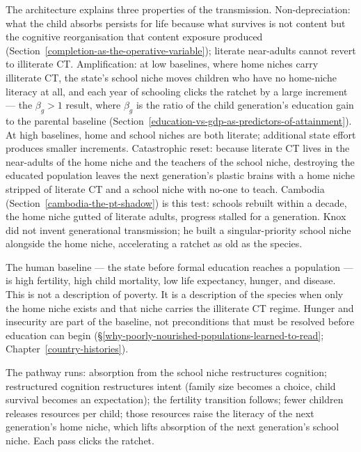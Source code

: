 \documentclass[12pt,letterpaper]{article}
\begin{document}
The architecture explains three properties of the transmission.
Non-depreciation: what the child absorbs persists for life because
what survives is not content but the cognitive reorganisation that
content exposure produced (Section~\ref{completion-as-the-operative-variable});
literate near-adults cannot revert to illiterate CT.
Amplification: at low baselines, where home niches carry illiterate
CT, the state's school niche moves children who have no home-niche
literacy at all, and each year of schooling clicks the ratchet by a
large increment --- the $\beta_g > 1$ result, where $\beta_g$ is the
ratio of the child generation's education gain to the parental
baseline (Section~\ref{education-vs-gdp-as-predictors-of-attainment}).
At high baselines, home and school niches are both literate;
additional state effort produces smaller increments. Catastrophic
reset: because literate CT lives in the near-adults of the home niche
and the teachers of the school niche, destroying the educated
population leaves the next generation's plastic brains with a home
niche stripped of literate CT and a school niche with no-one to
teach. Cambodia (Section~\ref{cambodia-the-pt-shadow}) is this test:
schools rebuilt within a decade, the home niche gutted of literate
adults, progress stalled for a generation. Knox did not invent
generational transmission; he built a singular-priority school niche
alongside the home niche, accelerating a ratchet as old as the
species.

The human baseline --- the state before formal education reaches a
population --- is high fertility, high child mortality, low life
expectancy, hunger, and disease. This is not a description of
poverty. It is a description of the species when only the home niche
exists and that niche carries the illiterate CT regime. Hunger and
insecurity are part of the baseline, not preconditions that must be
resolved before education can begin
(\S\ref{why-poorly-nourished-populations-learned-to-read};
Chapter~\ref{country-histories}).

The pathway runs: absorption from the school niche restructures
cognition; restructured cognition restructures intent (family size
becomes a choice, child survival becomes an expectation); the
fertility transition follows; fewer children releases resources per
child; those resources raise the literacy of the next generation's
home niche, which lifts absorption of the next generation's school
niche. Each pass clicks the ratchet.
\end{document}
